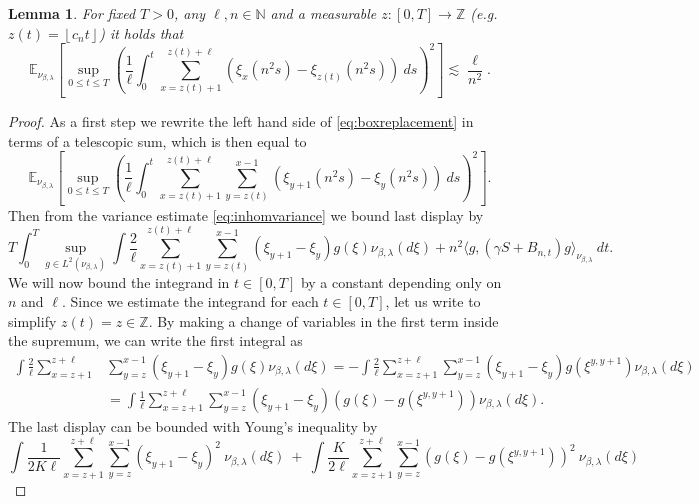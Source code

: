 \documentclass[10pt,a4paper]{amsart}
\newtheorem{lemma}{Lemma}
\newcommand{\N}{\mathbb{N}}
\newcommand{\Z}{\mathbb{Z}}
\newcommand{\ee}[1]{\mathbb{E}_{\nu_{\beta,\lambda}}\left[ #1 \right]}
\newcommand{\floor}[1]{\left\lfloor #1 \right\rfloor}
\newcommand{\parent}[1]{\left( #1 \right)}
\begin{document}
\begin{lemma} \label{lem:boxreplacement}
For fixed $T>0$, any $\ell,n\in\N$ and a measurable $z:[0,T]\to \Z$ (e.g. $z(t) = \floor{c_nt}$) it holds that 
\begin{equation} \label{eq:boxreplacement}
    \ee{\sup_{0\leq t\leq T} \left( \frac{1}{\ell}\int_0^t \sum_{x=z(t)+1 }^{z(t)+\ell}(\xi_{x}(n^2 s) -\xi_{z(t)}(n^2 s))\  ds \right)^2}  \lesssim \frac{\ell}{n^2}.
\end{equation}
\end{lemma}

\begin{proof} 
As a first step we rewrite the left hand side of \eqref{eq:boxreplacement} in terms of a telescopic sum, which is then equal to
\begin{equation*}
     \ee{\sup_{0\leq t\leq T} \parent{\frac{1}{\ell}\int_0^t \sum_{x=z(t)+1 }^{z(t)+\ell} \sum_{y = z(t)}^{x-1} (\xi_{y+1}(n^2 s) -\xi_y(n^2 s))\  ds }^2}.
\end{equation*}
Then from the variance estimate \eqref{eq:inhomvariance} we bound last display by 
\begin{equation} \label{eq:boxvariancebound}
T\int_0^T\sup_{g\in L^2(\nu_{\beta,\lambda})} \int \frac{2}{\ell} \sum_{x=z(t)+1 }^{z(t)+\ell} \sum_{y = z(t)}^{x-1} (\xi_{y+1} -\xi_y)g(\xi) \nu_{\beta,\lambda}(d\xi) + n^2  \langle g,(\gamma S+B_{n,t})g\rangle_{\nu_{\beta,\lambda}} \ dt.
\end{equation} 
We will now bound the integrand in $t \in [0,T]$ by a constant depending only on $n$ and $\ell$. Since we estimate the integrand for each $t\in[0,T]$, let us write to simplify $z(t) =z\in\Z$.  By making a change of variables in the first term inside the supremum, we can write the first integral as
\begin{equation*}
\begin{split}
    \int \frac{2}{\ell} \sum_{x=z+1 }^{z+\ell} &\sum_{y = z}^{x-1} (\xi_{y+1} -\xi_y) g(\xi) \nu_{\beta,\lambda}(d\xi) = - \int \frac{2}{\ell} \sum_{x=z+1 }^{z+\ell} \sum_{y = z}^{x-1} (\xi_{y+1} -\xi_y) g(\xi^{y,y+1}) \nu_{\beta,\lambda}(d\xi) \\
    & = \int \frac{1}{\ell} \sum_{x=z+1 }^{z+\ell} \sum_{y = z}^{x-1} (\xi_{y+1} -\xi_y) (g(\xi)- g(\xi^{y,y+1})) \nu_{\beta,\lambda}(d\xi).
\end{split}
\end{equation*}
The last display can be bounded with Young's inequality by
\begin{equation*}
    \int \frac{1}{2K\ell} \sum_{x=z+1 }^{z+\ell} \sum_{y = z}^{x-1} (\xi_{y+1} -\xi_y)^2 \ \nu_{\beta,\lambda}(d\xi) \ +\  \int \frac{K}{2\ell} \sum_{x=z+1 }^{z+\ell} \sum_{y = z}^{x-1} (g(\xi)- g(\xi^{y,y+1}))^2 \ \nu_{\beta,\lambda}(d\xi)

\end{equation*}
\end{proof}
\end{document}
